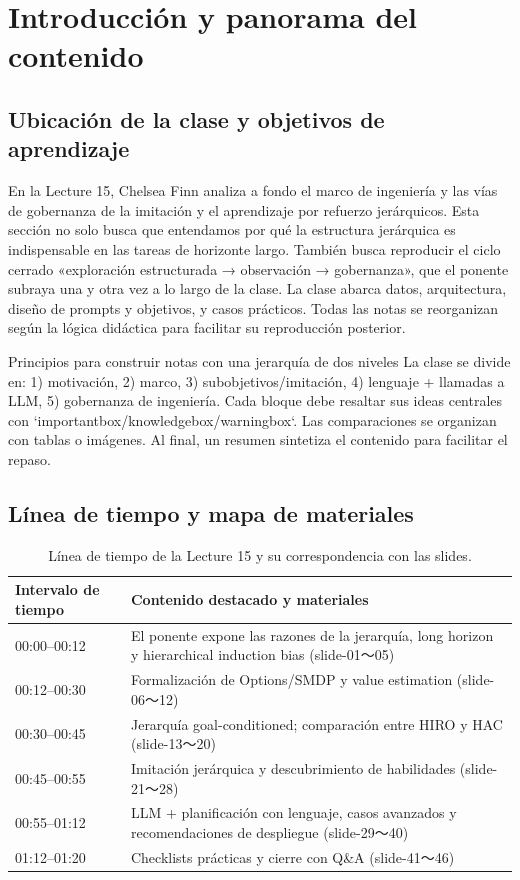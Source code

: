\section{Introducción y panorama del contenido}

\subsection{Ubicación de la clase y objetivos de aprendizaje}

En la Lecture 15, Chelsea Finn analiza a fondo el marco de ingeniería y las vías de gobernanza de la imitación y el aprendizaje por refuerzo jerárquicos. Esta sección no solo busca que entendamos por qué la estructura jerárquica es indispensable en las tareas de horizonte largo. También busca reproducir el ciclo cerrado «exploración estructurada → observación → gobernanza», que el ponente subraya una y otra vez a lo largo de la clase. La clase abarca datos, arquitectura, diseño de prompts y objetivos, y casos prácticos. Todas las notas se reorganizan según la lógica didáctica para facilitar su reproducción posterior.

\begin{knowledgebox}{Principios para construir notas con una jerarquía de dos niveles}
La clase se divide en: 1) motivación, 2) marco, 3) subobjetivos/imitación, 4) lenguaje + llamadas a LLM, 5) gobernanza de ingeniería. Cada bloque debe resaltar sus ideas centrales con `importantbox/knowledgebox/warningbox`. Las comparaciones se organizan con tablas o imágenes. Al final, un resumen sintetiza el contenido para facilitar el repaso.
\end{knowledgebox}

\subsection{Línea de tiempo y mapa de materiales}

\begin{table}[H]
\centering
\begin{tabular}{p{3.5cm}p{8cm}}
\toprule
Intervalo de tiempo & Contenido destacado y materiales \\
\midrule
00:00--00:12 & El ponente expone las razones de la jerarquía, long horizon y hierarchical induction bias (slide-01～05) \\
00:12--00:30 & Formalización de Options/SMDP y value estimation (slide-06～12) \\
00:30--00:45 & Jerarquía goal-conditioned; comparación entre HIRO y HAC (slide-13～20) \\
00:45--00:55 & Imitación jerárquica y descubrimiento de habilidades (slide-21～28) \\
00:55--01:12 & LLM + planificación con lenguaje, casos avanzados y recomendaciones de despliegue (slide-29～40) \\
01:12--01:20 & Checklists prácticas y cierre con Q\&A (slide-41～46) \\
\bottomrule
\end{tabular}
\caption{Línea de tiempo de la Lecture 15 y su correspondencia con las slides.}
\end{table}

